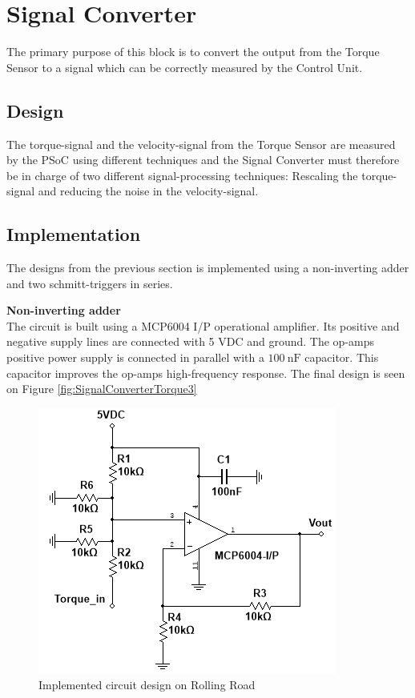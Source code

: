 \newpage
\section{Signal Converter}
The primary purpose of this block is to convert the output from the Torque Sensor to a signal which can be correctly measured by the Control Unit.

\subsection{Design}
The torque-signal and the velocity-signal from the Torque Sensor are measured by the PSoC using different techniques and the Signal Converter must therefore be in charge of two different signal-processing techniques: Rescaling the torque-signal and reducing the noise in the velocity-signal.




\newpage
\subsection{Implementation}
The designs from the previous section is implemented using a non-inverting adder and two schmitt-triggers in series.

\textbf{Non-inverting adder}\\
The circuit is built using a MCP6004 I/P operational amplifier. Its positive and negative supply lines are connected with 5 VDC and ground. The op-amps positive power supply is connected in parallel with a $\SI{100}{\nano \farad}$ capacitor. This capacitor improves the op-amps high-frequency response. The final design is seen on Figure \vref{fig:SignalConverterTorque3}

\begin{figure}[H]
	\centering
	\includegraphics[width=0.5\linewidth]{Hardware/SignalConverter/TorqueDesign3}
	\caption{Implemented circuit design on Rolling Road}
	\label{fig:SignalConverterTorque3}
\end{figure}

